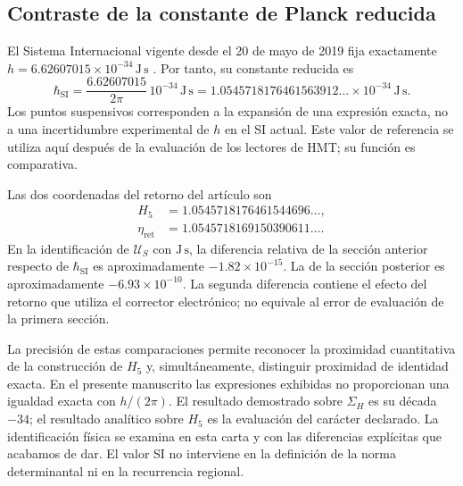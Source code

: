 \subsection{Contraste de la constante de Planck reducida}
\label{sec:revision-planck-contraste}

El Sistema Internacional vigente desde el 20 de mayo de 2019 fija
exactamente \(h=6.62607015\times10^{-34}\,\mathrm{J\,s}\)
\cite{bipm2018}. Por tanto, su constante reducida es
\[
 \hbar_{\mathrm{SI}}=\frac{6.62607015}{2\pi}\,10^{-34}\,
 \mathrm{J\,s}
 =1.0545718176461563912\ldots\times10^{-34}\,\mathrm{J\,s}.
\]
Los puntos suspensivos corresponden a la expansión de una expresión
exacta, no a una incertidumbre experimental de \(h\) en el SI actual.
Este valor de referencia se utiliza aquí después de la evaluación de
los lectores de HMT; su función es comparativa.

Las dos coordenadas del retorno del artículo son
\begin{align*}
 H_5&=1.0545718176461544696\ldots,\\
 \eta_{\mathrm{ret}}&=1.0545718169150390611\ldots.
\end{align*}
En la identificación de \(\mathcal U_S\) con \(\mathrm{J\,s}\), la
diferencia relativa de la sección anterior respecto de
\(\hbar_{\mathrm{SI}}\) es aproximadamente \(-1.82\times10^{-15}\).
La de la sección posterior es aproximadamente \(-6.93\times10^{-10}\).
La segunda diferencia contiene el efecto del retorno que utiliza el
corrector electrónico; no equivale al error de evaluación de la
primera sección.

La precisión de estas comparaciones permite reconocer la proximidad
cuantitativa de la construcción de \(H_5\) y, simultáneamente, distinguir
proximidad de identidad exacta. En el presente manuscrito las expresiones
exhibidas no proporcionan una igualdad exacta con \(h/(2\pi)\).
El resultado demostrado sobre \(\Sigma_H\) es su década \(-34\);
el resultado analítico sobre \(H_5\) es la evaluación del carácter
declarado. La identificación física se examina en esta carta y con las
diferencias explícitas que acabamos de dar. El valor SI no interviene
en la definición de la norma determinantal ni en la recurrencia regional.
